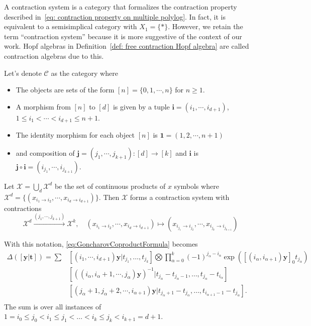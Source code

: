 A contraction system is a category that formalizes the contraction property described in~\eqref{eq: contraction property on multiple polylog}. In fact, it is equivalent to a semisimplical category with $X_1=\{*\}$. However, we retain the term ``contraction system'' because it is more suggestive of the context of our work. Hopf algebras in Definition~\ref{def: free contraction Hopf algebra} are called contraction algebras due to this.

Let's denote $\mathscr C$ as the category where
\begin{itemize}
\item The objects are sets of the form $[n]=\{0,1,\cdots,n\}$ for $n\geq1$.
\item A morphism from $[n]$ to $[d]$ is given by a tuple $\mathbf i=(i_1,\cdots,i_{d+1})$, $1\leq i_1<\cdots<i_{d+1}\leq n+1$.
\item The identity morphism for each object $[n]$ is $\mathbf 1=(1,2,\cdots,n+1)$
\item and composition of $\mathbf j=(j_1,\cdots,j_{k+1}):[d]\to[k]$ and $\mathbf i$ is $\mathbf j\circ\mathbf i=(i_{j_1},\cdots,i_{j_{k+1}})$.
\end{itemize}

\begin{example}\label{ex: contraction system X}
Let $\mathcal X=\bigcup_d\mathcal X^d$ be the set of continuous products of $x$ symbols where $\mathcal X^d=\{(x_{i_1\to i_2},\cdots,x_{i_d\to i_{d+1}})\}$. Then $\mathcal X$ forms a contraction system with contractions
\[
\mathcal X^d\xrightarrow{(j_1,\cdots,j_{k+1})}\mathcal X^k,\quad (x_{i_1\to i_2},\cdots,x_{i_d\to i_{d+1}})\mapsto(x_{i_{j_1}\to i_{j_2}},\cdots,x_{i_{j_k}\to i_{j_{k+1}}})
\]
\end{example}

With this notation, \eqref{eq:GoncharovCoproductFormula} becomes
\begin{equation}\label{eq:GoncharovCoproductFormulaWithContractions}
\begin{aligned}
\Delta([\mathbf y|\mathbf t])=\sum&[(i_1,\cdots,i_{d+1})\mathbf y|t_{j_1},\dots,t_{j_k}]\bigotimes\prod_{\alpha=0}^k(-1)^{j_\alpha-i_\alpha}\exp([(i_{\alpha},i_{\alpha+1})\mathbf y]_0t_{j_\alpha})\\
&[((i_\alpha,i_\alpha+1,\cdots,j_\alpha)\mathbf y)^{-1}|t_{j_\alpha}-t_{j_\alpha-1},\dots, t_{j_\alpha}-t_{i_\alpha}]\\
&[(j_\alpha+1,j_\alpha+2,\cdots,i_{\alpha+1})\mathbf y|t_{j_\alpha+1}-t_{j_\alpha},\dots,t_{i_{\alpha+1}-1}-t_{j_\alpha}].\\
\end{aligned}
\end{equation}
The sum is over all instances of $1=i_0\leq j_0<i_1\leq j_1<\dots <i_k\leq j_k<i_{k+1}=d+1$.

